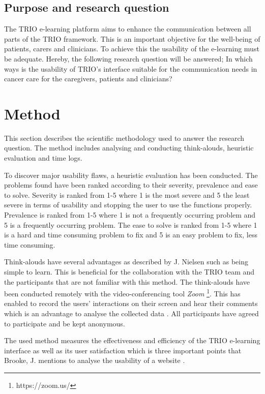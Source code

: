 \documentclass{sigchi}
\begin{document}
\subsection{Purpose and research question}
The TRIO e-learning platform aims to enhance the communication between all parts of the TRIO framework. This is an important objective for the well-being of patients, carers and clinicians. To achieve this the usability of the e-learning must be adequate. Hereby, the following research question will be answered; In which ways is the usability of TRIO's interface suitable for the communication needs in cancer care for the caregivers, patients and clinicians?

\section{Method}
This section describes the scientific methodology used to answer the research question. The method includes analysing and conducting think-alouds, heuristic evaluation and time logs.

To discover major usability flaws, a heuristic evaluation has been conducted. The problems found have been ranked according to their severity, prevalence and ease to solve. Severity is ranked from 1-5 where 1 is the most severe and 5 the least severe in terms of usability and stopping the user to use the functions properly. Prevalence is ranked from 1-5 where 1 is not a frequently occurring problem and 5 is a frequently occurring problem. The ease to solve is ranked from 1-5 where 1 is a hard and time consuming problem to fix and 5 is an easy problem to fix, less time consuming. 

Think-alouds have several advantages as described by J. Nielsen \cite{nielsen2012thinking} such as being simple to learn. This is beneficial for the collaboration with the TRIO team and the participants that are not familiar with this method. The think-alouds have been conducted remotely with the video-conferencing tool \textit{Zoom} \footnote{https://zoom.us/}. This has enabled to record the users' interactions on their screen and hear their comments which is an advantage to analyse the collected data \cite{hammontree1994remote}. All participants have agreed to participate and be kept anonymous.

The used method measures the effectiveness and efficiency of the TRIO e-learning interface as well as its user satisfaction which is three important points that Brooke, J. mentions to analyse the usability of a website \cite{brooke1996sus}.
\end{document}
